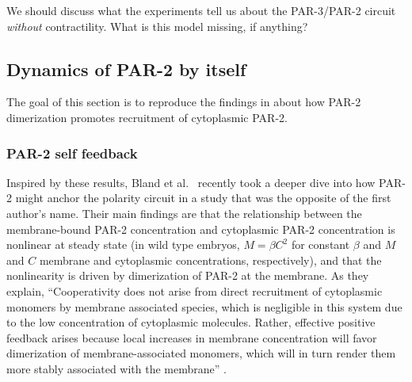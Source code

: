 \documentclass[11pt]{article}
\newcommand{\red}[1]{\color{red}#1\normalcolor}
\newcommand{\6}[1]{#1_{\text{6}}}
\newcommand{\3}[1]{#1_{\text{3}}}
\begin{document}
\red{We should discuss what the experiments tell us about the PAR-3/PAR-2 circuit \emph{without} contractility. What is this model missing, if anything?}

\iffalse
\subsection{Dynamics of PAR-2 by itself}
The goal of this section is to reproduce the findings in \cite{bland2023optimized} about how PAR-2 dimerization promotes recruitment of cytoplasmic PAR-2.

\subsubsection{PAR-2 self feedback}
Inspired by these results, Bland et al.\ \cite{bland2023optimized} recently took a deeper dive into how PAR-2 might anchor the polarity circuit in a study that was the opposite of the first author's name. Their main findings are that the relationship between the membrane-bound PAR-2 concentration and cytoplasmic PAR-2 concentration is nonlinear at steady state (in wild type embryos, $M=\beta C^2$ for constant $\beta$ and $M$ and $C$ membrane and cytoplasmic concentrations, respectively), and that the nonlinearity is driven by dimerization of PAR-2 at the membrane. As they explain, ``Cooperativity does not arise from direct recruitment of cytoplasmic monomers by membrane
associated species, which is negligible in this system due to the low concentration of
cytoplasmic molecules. Rather, effective positive feedback arises because
local increases in membrane concentration will favor dimerization of membrane-associated
monomers, which will in turn render them more stably associated with the membrane'' \cite{bland2023optimized}. 
\end{document}
